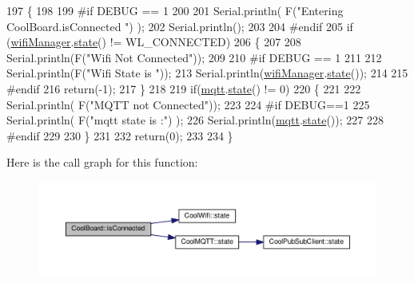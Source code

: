 \begin{DoxyCode}
197 \{
198 
199 \textcolor{preprocessor}{#if DEBUG == 1  }
200 
201     Serial.println( F(\textcolor{stringliteral}{"Entering CoolBoard.isConnected "}) );
202     Serial.println();
203 
204 \textcolor{preprocessor}{#endif}
205     \textcolor{keywordflow}{if} (\hyperlink{class_cool_board_acd88e6003606b47479ebba81e4aceeca}{wifiManager}.\hyperlink{class_cool_wifi_a1c7b4d82a4098d346e7593dce92039fa}{state}() != WL\_CONNECTED)
206     \{
207     
208         Serial.println(F(\textcolor{stringliteral}{"Wifi Not Connected"}));
209 
210 \textcolor{preprocessor}{    #if DEBUG == 1}
211 
212         Serial.println(F(\textcolor{stringliteral}{"Wifi State is "}));
213         Serial.println(\hyperlink{class_cool_board_acd88e6003606b47479ebba81e4aceeca}{wifiManager}.\hyperlink{class_cool_wifi_a1c7b4d82a4098d346e7593dce92039fa}{state}());
214         
215 \textcolor{preprocessor}{    #endif}
216         \textcolor{keywordflow}{return}(-1);
217     \}
218     
219     \textcolor{keywordflow}{if}(\hyperlink{class_cool_board_a2399f44d7c23c1149a335cb3b46d90f1}{mqtt}.\hyperlink{class_cool_m_q_t_t_a5d003307eff78efbd585e42b43b72b6d}{state}() != 0)
220     \{
221         
222         Serial.println( F(\textcolor{stringliteral}{"MQTT not Connected"}));
223 
224 \textcolor{preprocessor}{    #if DEBUG==1}
225         Serial.println( F(\textcolor{stringliteral}{"mqtt state is :"}) );
226         Serial.println(\hyperlink{class_cool_board_a2399f44d7c23c1149a335cb3b46d90f1}{mqtt}.\hyperlink{class_cool_m_q_t_t_a5d003307eff78efbd585e42b43b72b6d}{state}());  
227     
228 \textcolor{preprocessor}{    #endif}
229 
230     \}
231     
232     \textcolor{keywordflow}{return}(0);
233 
234 \}
\end{DoxyCode}
Here is the call graph for this function\+:\nopagebreak
\begin{figure}[H]
\begin{center}
\leavevmode
\includegraphics[width=350pt]{d7/df9/class_cool_board_ad7442cf4b62c7b0d5bd62a0f75ffc065_cgraph}
\end{center}
\end{figure}
\mbox{\label{class_cool_board_ae6b5e1274d760462290192acea4adca8}} 
